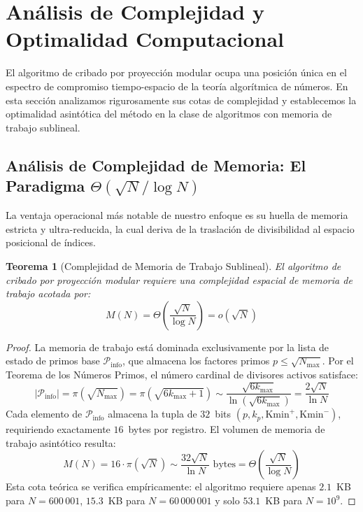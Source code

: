 \documentclass{article}
\numberwithin{equation}{section}
\theoremstyle{plain}
\newtheorem{theorem}{Teorema}[section]
\theoremstyle{definition}
\begin{document}

\section{Análisis de Complejidad y Optimalidad Computacional}
\label{sec:complejidad-optimalidad}

El algoritmo de cribado por proyección modular ocupa una posición única en el espectro de compromiso tiempo-espacio de la teoría algorítmica de números. En esta sección analizamos rigurosamente sus cotas de complejidad y establecemos la optimalidad asintótica del método en la clase de algoritmos con memoria de trabajo sublineal.

\subsection{Análisis de Complejidad de Memoria: El Paradigma $\Theta(\sqrt{N}/\log N)$}

La ventaja operacional más notable de nuestro enfoque es su huella de memoria estricta y ultra-reducida, la cual deriva de la traslación de divisibilidad al espacio posicional de índices.

\begin{theorem}[Complejidad de Memoria de Trabajo Sublineal]
\label{thm:complejidad-memoria}
El algoritmo de cribado por proyección modular requiere una complejidad espacial de memoria de trabajo acotada por:
\begin{equation}
M(N) = \Theta\left(\frac{\sqrt{N}}{\log N}\right) = o(\sqrt{N})
\end{equation}
\end{theorem}

\begin{proof}
La memoria de trabajo está dominada exclusivamente por la lista de estado de primos base $\mathcal{P}_{\text{info}}$, que almacena los factores primos $p \le \sqrt{N_{\max}}$. Por el Teorema de los Números Primos, el número cardinal de divisores activos satisface:
\begin{equation}
|\mathcal{P}_{\text{info}}| = \pi(\sqrt{N_{\max}}) = \pi(\sqrt{6k_{\max}+1}) \sim \frac{\sqrt{6k_{\max}}}{\ln(\sqrt{6k_{\max}})} = \frac{2\sqrt{N}}{\ln N}
\end{equation}
Cada elemento de $\mathcal{P}_{\text{info}}$ almacena la tupla de $32$~bits $(p, k_p, \mathrm{Kmin}^+, \mathrm{Kmin}^-)$, requiriendo exactamente $16$~bytes por registro. El volumen de memoria de trabajo asintótico resulta:
\begin{equation}
M(N) = 16 \cdot \pi(\sqrt{N}) \sim \frac{32 \sqrt{N}}{\ln N} \text{ bytes} = \Theta\left(\frac{\sqrt{N}}{\log N}\right)
\end{equation}
Esta cota teórica se verifica empíricamente: el algoritmo requiere apenas $2.1$~KB para $N=600\,001$, $15.3$~KB para $N=60\,000\,001$ y solo $53.1$~KB para $N=10^9$.
\end{proof}
\end{document}

